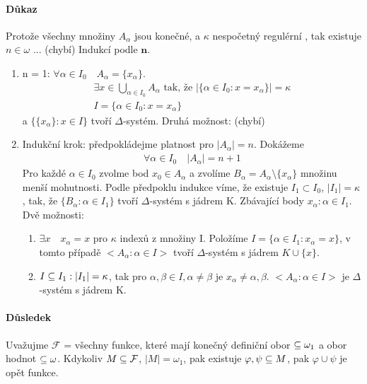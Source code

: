 \documentclass[a4paper,12pt,titlepage]{article}
\begin{document}
\paragraph{Důkaz}
Protože všechny množiny $A_\alpha$ jsou konečné, a $\kappa$ nespočetný regulérní ,
tak existuje $n \in \omega$ ... (chybí)
Indukcí podle $\mathbf{n}$.
\begin{enumerate}
	\item n = 1: $\forall \alpha \in I_0 \quad A_\alpha = \{x_\alpha\}$.
	\begin{align}
		\exists x \in \bigcup_{\alpha \in I_0} A_\alpha \text{ tak, že }
		|\{\alpha \in I_0 : x = x_\alpha \}| = \kappa \\
		I = \{ \alpha \in I_0 : x = x_\alpha \}
	\end{align}
	a $\{\{x_\alpha\}: x \in I\}$ tvoří $\Delta$-systém.
	Druhá možnost: (chybí)
	\item Indukční krok: předpokládejme platnost pro $|A_\alpha| = n$. Dokážeme
	\begin{align}
		\forall \alpha \in I_0 \quad |A_\alpha| = n + 1
	\end{align}
	Pro každé $\alpha \in I_0$ zvolme bod $x_0 \in A_\alpha$ a zvolíme $B_\alpha
	= A_\alpha \setminus \{x_\alpha\}$  množinu menší mohutnosti. Podle
	předpoklu indukce víme, že existuje $I_1 \subset I_0$, $|I_1| = \kappa$, tak,
	že $\{B_\alpha : \alpha \in I_1\}$ tvoří $\Delta$-systém s jádrem K.
	Zbávající body $x_\alpha : \alpha \in I_1$. \\
	Dvě možnosti:
	\begin{enumerate}
		\item $\exists x \quad x_\alpha = x $ pro $\kappa$ indexů z množiny I.
		Položíme $I = \{ \alpha \in I_1: x_\alpha = x\}$, v tomto případě
		$<A_\alpha: \alpha \in I>$ tvoří $\Delta$-systém s jádrem $K\cup\{x\}$.
		\item $I \subseteq I_1: |I_1| = \kappa$, tak pro $\alpha, \beta \in I,
		\alpha \neq \beta$ je $x_\alpha \neq \alpha, \beta$. $<A_\alpha : \alpha \in
		I>$ je $\Delta$-systém s jádrem K.
	\end{enumerate}
\end{enumerate}
\paragraph{Důsledek}
Uvažujme $\mathcal{F}$ = všechny funkce, které mají konečný definiční obor
$\subseteq \omega_1$ a obor hodnot $\subseteq \omega$. Kdykoliv $M \subseteq
\mathcal{F}$, $|M| = \omega_1$, pak existuje $\varphi, \psi \subseteq M$, pak
$\varphi \cup \psi$ je opět funkce.
\end{document}
